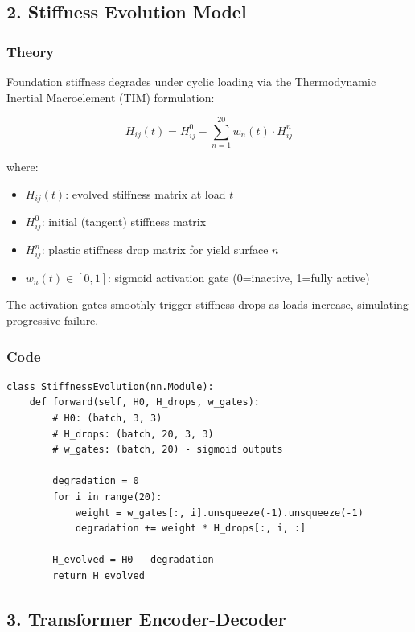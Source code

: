 \documentclass[11pt,a4paper]{article}
\begin{document}
\subsection{2. Stiffness Evolution Model}

\subsubsection{Theory}
Foundation stiffness degrades under cyclic loading via the Thermodynamic Inertial Macroelement (TIM) formulation:

\begin{equation}
H_{ij}(t) = H^0_{ij} - \sum_{n=1}^{20} w_n(t) \cdot H^n_{ij}
\end{equation}

where:
\begin{itemize}
  \item $H_{ij}(t)$: evolved stiffness matrix at load $t$
  \item $H^0_{ij}$: initial (tangent) stiffness matrix
  \item $H^n_{ij}$: plastic stiffness drop matrix for yield surface $n$
  \item $w_n(t) \in [0,1]$: sigmoid activation gate (0=inactive, 1=fully active)
\end{itemize}

The activation gates smoothly trigger stiffness drops as loads increase, simulating progressive failure.

\subsubsection{Code}

\begin{lstlisting}
class StiffnessEvolution(nn.Module):
    def forward(self, H0, H_drops, w_gates):
        # H0: (batch, 3, 3)
        # H_drops: (batch, 20, 3, 3)
        # w_gates: (batch, 20) - sigmoid outputs

        degradation = 0
        for i in range(20):
            weight = w_gates[:, i].unsqueeze(-1).unsqueeze(-1)
            degradation += weight * H_drops[:, i, :]

        H_evolved = H0 - degradation
        return H_evolved
\end{lstlisting}

\subsection{3. Transformer Encoder-Decoder}
\end{document}
